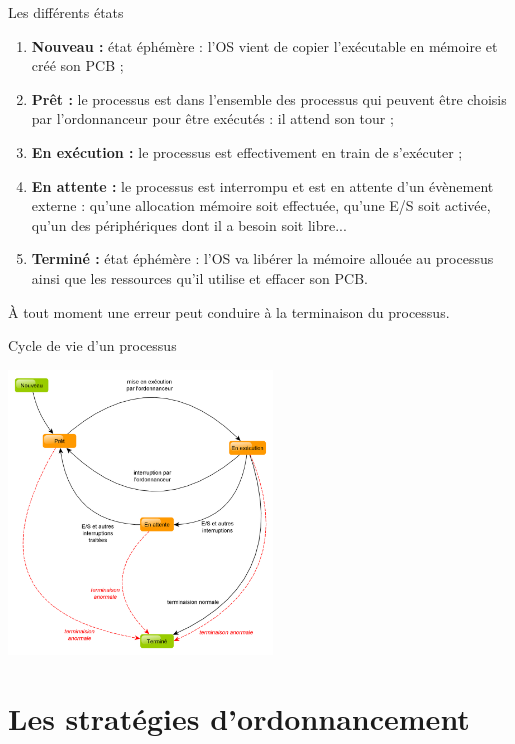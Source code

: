 \documentclass[10pt]{beamer}
\begin{document}
\begin{frame}{Les différents états}\pause
\begin{enumerate}[--]
	\item \textbf{Nouveau : } état éphémère : l'OS vient de copier l'exécutable en mémoire et créé son PCB ;\pause 
    \item \textbf{Prêt : } le processus est dans l'ensemble des processus qui peuvent être choisis par l'ordonnanceur pour être exécutés : il attend son tour ;\pause
    \item \textbf{En exécution :} le processus est effectivement en train de s'exécuter ;\pause
    \item \textbf{En attente :} le processus est interrompu et est en attente d'un évènement externe : qu'une allocation mémoire soit effectuée, qu'une E/S soit activée, qu'un des périphériques dont il a besoin soit libre...\pause
    \item \textbf{Terminé :} état éphémère : l'OS va libérer la mémoire allouée au processus ainsi que les ressources qu'il utilise et effacer son PCB.\pause
\end{enumerate}
À tout moment une erreur peut conduire à la terminaison du processus.
\end{frame}

\begin{frame}{Cycle de vie d'un processus}
\begin{center}
\includegraphics[width=7cm]{img/cycle_proc}
\end{center}
\end{frame}

\section{Les stratégies d'ordonnancement}
\end{document}
